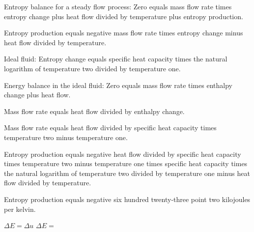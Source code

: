 Entropy balance for a steady flow process:  
Zero equals mass flow rate times entropy change plus heat flow divided by temperature plus entropy production.  

Entropy production equals negative mass flow rate times entropy change minus heat flow divided by temperature.  

Ideal fluid:  
Entropy change equals specific heat capacity times the natural logarithm of temperature two divided by temperature one.  

Energy balance in the ideal fluid:  
Zero equals mass flow rate times enthalpy change plus heat flow.  

Mass flow rate equals heat flow divided by enthalpy change.  

Mass flow rate equals heat flow divided by specific heat capacity times temperature two minus temperature one.  

Entropy production equals negative heat flow divided by specific heat capacity times temperature two minus temperature one times specific heat capacity times the natural logarithm of temperature two divided by temperature one minus heat flow divided by temperature.  

Entropy production equals negative six hundred twenty-three point two kilojoules per kelvin.

\( \Delta E = \Delta u \)  
\( \Delta E = \)